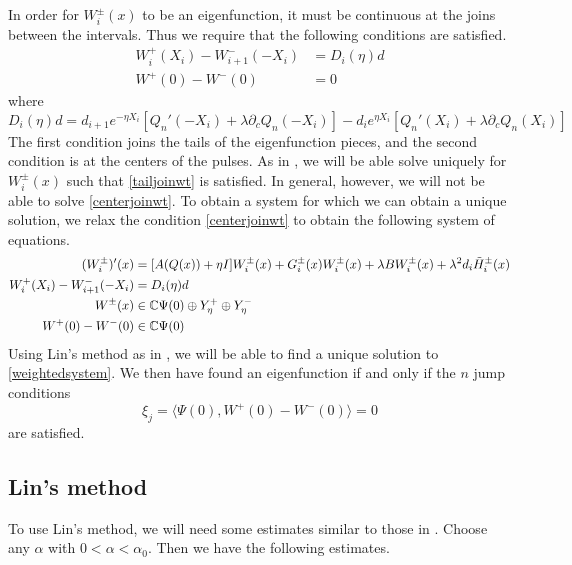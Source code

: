 \documentclass[thesis.tex]{subfiles}
\begin{document}
In order for $W_i^\pm(x)$ to be an eigenfunction, it must be continuous at the joins between the intervals. Thus we require that the following conditions are satisfied.
\begin{align}
W_i^+(X_i) - W_{i+1}^-(-X_i) &= D_i(\eta) d \label{tailjoinwt} \\
W^+(0) - W^-(0) &= 0 \label{centerjoinwt}
\end{align}
where
\begin{equation}\label{Dideta}
D_i(\eta) d = d_{i+1} e^{-\eta X_i}[ Q_n'(-X_i) + \lambda \partial_c Q_n(-X_i)] 
- d_i e^{\eta X_i}[ Q_n'(X_i) + \lambda \partial_c Q_n(X_i)] 
\end{equation}
The first condition joins the tails of the eigenfunction pieces, and the second condition is at the centers of the pulses. As in \cite{Sandstede1998}, we will be able solve uniquely for $W_i^\pm(x)$ such that \cref{tailjoinwt} is satisfied. In general, however, we will not be able to solve \cref{centerjoinwt}. To obtain a system for which we can obtain a unique solution, we relax the condition \cref{centerjoinwt} to obtain the following system of equations.
\begin{equation}\label{weightedsystem}
\begin{aligned}
(W_i^\pm)'(x) &= [A(Q(x)) + \eta I] W_i^\pm(x)+ G_i^\pm(x)W_i^\pm(x) + \lambda B W_i^\pm(x) + \lambda^2 d_i \tilde{H}_i^\pm(x) \\
W_i^+(X_i) - W_{i+1}^-(-X_i) &= D_i(\eta) d \\
W^\pm(x) &\in \mathbb{C} \Psi(0) \oplus Y_\eta^+ \oplus Y_\eta^- \\
W^+(0) - W^-(0) &\in \mathbb{C} \Psi(0)
\end{aligned}
\end{equation}
Using Lin's method as in \cite{Sandstede1998}, we will be able to find a unique solution to \cref{weightedsystem}. We then have found an eigenfunction if and only if the $n$ jump conditions
\begin{equation}\label{weightedjumps}
\xi_j = \langle \Psi(0), W^+(0) - W^-(0) \rangle = 0
\end{equation}
are satisfied.

\subsection{Lin's method}

To use Lin's method, we will need some estimates similar to those in \cite[Lemma 3.1]{Sandstede1998}. Choose any $\alpha$ with $0 < \alpha < \alpha_0$. Then we have the following estimates.
\end{document}
